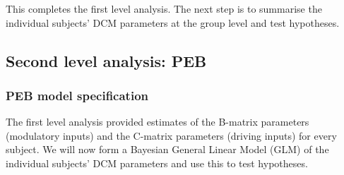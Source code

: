 \documentclass{article}
\begin{document}
This completes the first level analysis. The next step is to summarise the individual subjects' DCM parameters at the group level and test hypotheses.

\subsection{Second level analysis: PEB}
\subsubsection{PEB model specification} \label{GUI_PEBspec}
The first level analysis provided estimates of the B-matrix parameters (modulatory inputs) and the C-matrix parameters (driving inputs) for every subject. We will now form a Bayesian General Linear Model (GLM) of the individual subjects' DCM parameters and use this to test hypotheses. 
\end{document}
